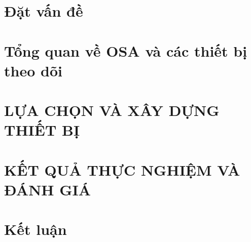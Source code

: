 \documentclass[12pt,a4paper,oneside]{book} %
\begin{document}
\mainmatter



\changefontsizes[16pt]{13pt}
\chapter*{Đặt vấn đề}
\thispagestyle{empty}


\chapter{Tổng quan về OSA và các thiết bị theo dõi \label{background_section}}


\chapter{LỰA CHỌN VÀ XÂY DỰNG THIẾT BỊ\label{the_proposed_method_section}}


\chapter{KẾT QUẢ THỰC NGHIỆM VÀ ĐÁNH GIÁ}


% 
\chapter{Kết luận}



% 



% 



\newpage
\printbibliography[heading=bibintoc, title=Tài liệu tham khảo]
\end{document}
